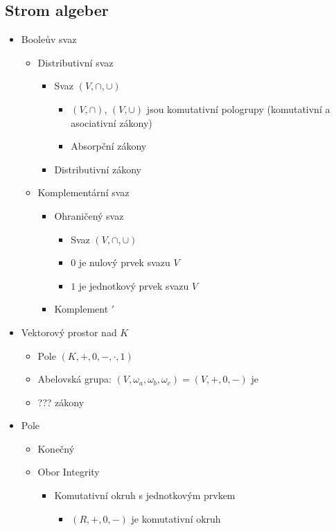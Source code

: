 \documentclass[a4paper, 11pt]{report}
\begin{document}
\subsection{Strom algeber}
\begin{itemize}
\item Booleův svaz
 \begin{itemize}
 \item Distributivní svaz
  \begin{itemize}
  \item Svaz $(V, \cap, \cup)$
   \begin{itemize}
   \item $(V, \cap)$, $(V, \cup)$ jsou komutativní pologrupy (komutativní a asociativní zákony)
   \item Absorpční zákony
   \end{itemize}
  \item Distributivní zákony
  \end{itemize}
 \item Komplementární svaz
  \begin{itemize}
  \item Ohraničený svaz
   \begin{itemize}
   \item Svaz $(V, \cap, \cup)$
   \item $0$ je nulový prvek svazu $V$
   \item $1$ je jednotkový prvek svazu $V$
   \end{itemize}
  \item Komplement $'$
  \end{itemize}
 \end{itemize}
\item Vektorový prostor nad $K$
 \begin{itemize}
 \item Pole $(K, +, 0, -, \cdot, 1)$
 \item Abelovská grupa: $(V, \omega_a, \omega_b, \omega_c) = (V, +, 0, -)$ je 
 \item ??? zákony
 \end{itemize}
\item Pole
 \begin{itemize}
 \item Konečný
 \item Obor Integrity
  \begin{itemize}
  \item Komutativní okruh s jednotkovým prvkem
   \begin{itemize}
   \item $(R, +, 0, -)$ je komutativní okruh

\end{itemize}
\end{itemize}
\end{itemize}
\end{itemize}
\end{document}
